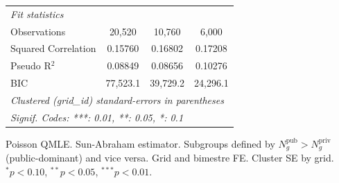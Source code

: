 \begin{tabular}{lccc}
   \midrule
   \emph{Fit statistics}\\
   Observations        & 20,520         & 10,760          & 6,000\\  
   Squared Correlation & 0.15760        & 0.16802         & 0.17208\\  
   Pseudo R$^2$        & 0.08849        & 0.08656         & 0.10276\\  
   BIC                 & 77,523.1       & 39,729.2        & 24,296.1\\  
   \midrule \midrule
   \multicolumn{4}{l}{\emph{Clustered (grid\_id) standard-errors in parentheses}}\\
   \multicolumn{4}{l}{\emph{Signif. Codes: ***: 0.01, **: 0.05, *: 0.1}}\\
\end{tabular}
 
\par \raggedright 
Poisson QMLE. Sun-Abraham estimator. Subgroups defined by $N^{\text{pub}}_g > N^{\text{priv}}_g$ (public-dominant) and vice versa. Grid and bimestre FE. Cluster SE by grid. $^{*}p<0.10$, $^{**}p<0.05$, $^{***}p<0.01$.
\par\endgroup


